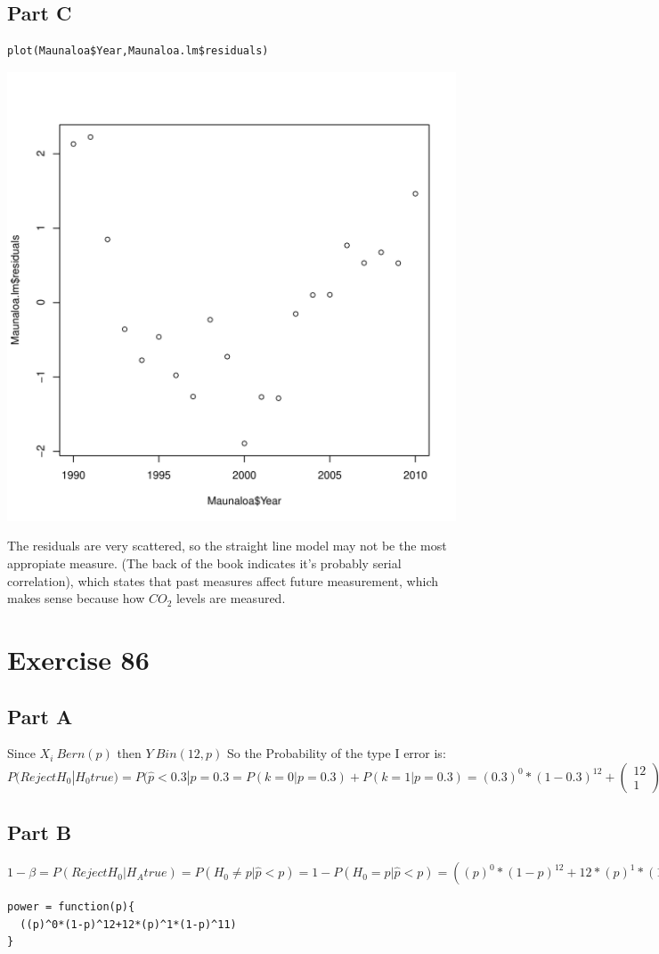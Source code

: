 \documentclass{article}\usepackage[]{graphicx}\usepackage[]{color}
\makeatletter
\newenvironment{kframe}{%
 \def\at@end@of@kframe{}%
 \ifinner\ifhmode%
  \def\at@end@of@kframe{\end{minipage}}%
  \begin{minipage}{\columnwidth}%
 \fi\fi%
 \def\FrameCommand##1{\hskip\@totalleftmargin \hskip-\fboxsep
 \colorbox{shadecolor}{##1}\hskip-\fboxsep
     \hskip-\linewidth \hskip-\@totalleftmargin \hskip\columnwidth}%
 \MakeFramed {\advance\hsize-\width
   \@totalleftmargin\z@ \linewidth\hsize
   \@setminipage}}%
 {\par\unskip\endMakeFramed%
 \at@end@of@kframe}
\newenvironment{knitrout}{}{} %
\makeatother
\begin{document}
\subsection*{Part C}
\begin{knitrout}
\color{fgcolor}\begin{kframe}
\begin{verbatim}
plot(Maunaloa$Year,Maunaloa.lm$residuals)
\end{verbatim}
\end{kframe}
\includegraphics[width=0.33\linewidth]{figure/unnamed-chunk-13-1} 

\end{knitrout}
The residuals are very scattered, so the straight line model may not be the most appropiate measure. (The back of the book indicates it's probably serial correlation), which states that past measures affect future measurement, which makes sense because how $CO_{2}$ levels are measured.
\section*{Exercise 86}
\subsection*{Part A}
Since $X_{i}~Bern(p)$ then $Y~Bin(12, p)$
So the Probability of the type I error is:
$P(Reject H_{0}|H_{0} true) = P(\hat{p}<0.3|p=0.3 = P(k=0|p=0.3)+P(k=1|p=0.3)=(0.3)^0*(1-0.3)^{12}+\left(\begin{array}{c}
12\\
1
\end{array}\right)*(0.3)^1*(1-0.3)^{11}=0.0850250$

\subsection*{Part B}
$1 - \beta = P(Reject H_{0} | H_{A} true)=P(H_{0}\not=p| \hat{p}<p)=1-P(H_{0}=p| \hat{p}<p) = ((p)^0*(1-p)^{12}+12*(p)^1*(1-p)^{11})$
\begin{knitrout}
\color{fgcolor}\begin{kframe}
\begin{verbatim}
power = function(p){
  ((p)^0*(1-p)^12+12*(p)^1*(1-p)^11)
}
\end{verbatim}
\end{kframe}
\end{knitrout}
\end{document}
